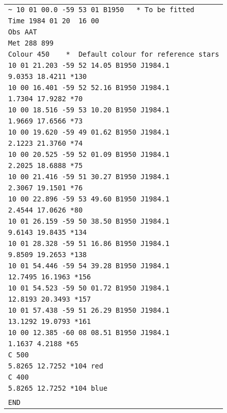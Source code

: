 \begin{center}
\begin{small}
\begin{tabular}{|l|}
\verb|~ 10 01 00.0 -59 53 01 B1950   * To be fitted| \\
\verb|Time 1984 01 20  16 00| \\
\verb|Obs AAT| \\
\verb|Met 288 899| \\
\verb|Colour 450    *  Default colour for reference stars| \\
\verb|10 01 21.203 -59 52 14.05 B1950 J1984.1| \\
\verb|9.0353 18.4211 *130| \\
\verb|10 00 16.401 -59 52 52.16 B1950 J1984.1| \\
\verb|1.7304 17.9282 *70| \\
\verb|10 00 18.516 -59 53 10.20 B1950 J1984.1| \\
\verb|1.9669 17.6566 *73| \\
\verb|10 00 19.620 -59 49 01.62 B1950 J1984.1| \\
\verb|2.1223 21.3760 *74| \\
\verb|10 00 20.525 -59 52 01.09 B1950 J1984.1| \\
\verb|2.2025 18.6888 *75| \\
\verb|10 00 21.416 -59 51 30.27 B1950 J1984.1| \\
\verb|2.3067 19.1501 *76| \\
\verb|10 00 22.896 -59 53 49.60 B1950 J1984.1| \\
\verb|2.4544 17.0626 *80| \\
\verb|10 01 26.159 -59 50 38.50 B1950 J1984.1| \\
\verb|9.6143 19.8435 *134| \\
\verb|10 01 28.328 -59 51 16.86 B1950 J1984.1| \\
\verb|9.8509 19.2653 *138| \\
\verb|10 01 54.446 -59 54 39.28 B1950 J1984.1| \\
\verb|12.7495 16.1963 *156| \\
\verb|10 01 54.523 -59 50 01.72 B1950 J1984.1| \\
\verb|12.8193 20.3493 *157| \\
\verb|10 01 57.438 -59 51 26.29 B1950 J1984.1| \\
\verb|13.1292 19.0793 *161| \\
\verb|10 00 12.385 -60 08 08.51 B1950 J1984.1| \\
\verb|1.1637 4.2188 *65| \\
\verb|C 500| \\
\verb|5.8265 12.7252 *104 red| \\
\verb|C 400| \\
\verb|5.8265 12.7252 *104 blue| \\
\\
\verb|END| \\
\hline
\end{tabular}
\end{small}
\end{center}

